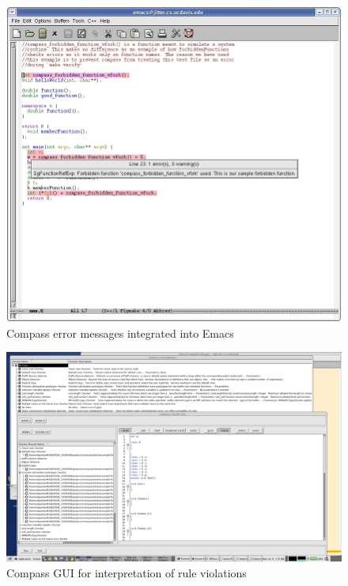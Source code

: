 \begin{figure}
\hspace{-0.7in}
\includegraphics[width=7in]{emacs_screenshot.jpg}
\caption{Compass error messages integrated into Emacs}
\label{Compass_Emacs_Screenshot}
\end{figure}

\begin{figure}
\hspace{-1.35in}
\includegraphics[width=7in]{CompassScreenshot.pdf}
\caption{Compass GUI for interpretation of rule violations}
\label{Compass_GUI}
\end{figure}

